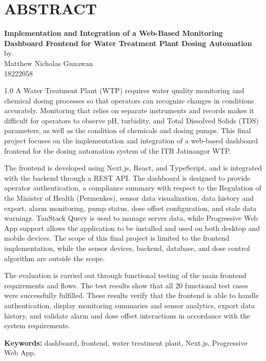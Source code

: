 \chapter*{ABSTRACT}

\begin{center}
    \textbf{Implementation and Integration of a Web-Based Monitoring Dashboard Frontend for Water Treatment Plant Dosing Automation} \\
    \vspace{0.4cm}
    by \\
    \vspace{0.4cm}
    Matthew Nicholas Gunawan\\
    18222058\\
\end{center}

\begin{spacing}{1.0}
A Water Treatment Plant (WTP) requires water quality monitoring and chemical
dosing processes so that operators can recognize changes in conditions
accurately. Monitoring that relies on separate instruments and records makes it
difficult for operators to observe pH, turbidity, and Total Dissolved Solids
(TDS) parameters, as well as the condition of chemicals and dosing pumps. This
final project focuses on the implementation and integration of a web-based
dashboard frontend for the dosing automation system of the ITB Jatinangor WTP.

The frontend is developed using Next.js, React, and TypeScript, and is
integrated with the backend through a REST API. The dashboard is designed to
provide operator authentication, a compliance summary with respect to the
Regulation of the Minister of Health (Permenkes), sensor data visualization,
data history and export, alarm monitoring, pump status, dose offset
configuration, and stale data warnings. TanStack Query is used to manage server
data, while Progressive Web App support allows the application to be installed
and used on both desktop and mobile devices. The scope of this final project is
limited to the frontend implementation, while the sensor devices, backend,
database, and dose control algorithm are outside the scope.

The evaluation is carried out through functional testing of the main frontend
requirements and flows. The test results show that all 20 functional test cases
were successfully fulfilled. These results verify that the frontend is able to
handle authentication, display monitoring summaries and sensor analytics,
export data history, and validate alarm and dose offset interactions in
accordance with the system requirements.

\noindent\textbf{Keywords:} dashboard, frontend, water treatment plant, Next.js, Progressive Web App.
\end{spacing}
